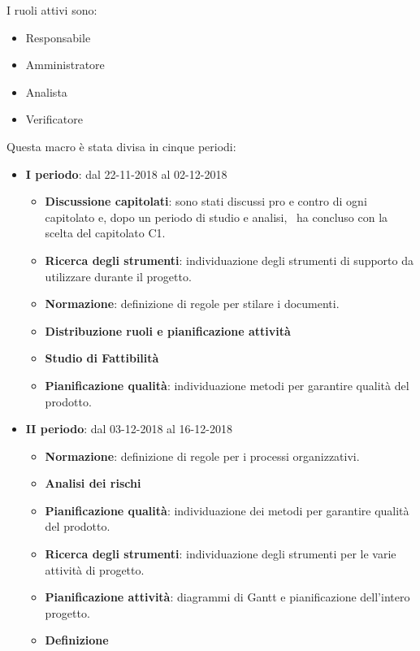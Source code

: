        I ruoli attivi sono:
        \begin{itemize}
            \item Responsabile
            \item Amministratore
            \item Analista
            \item Verificatore
        \end{itemize}
        Questa macro è stata divisa in cinque periodi:
		\begin{itemize}
			\item \textbf{I periodo}: dal 22-11-2018 al 02-12-2018
			\begin{itemize}
    	        \item \textbf{Discussione capitolati}: sono stati discussi pro e contro di ogni capitolato e, dopo un periodo di
				studio e analisi, \gruppo\ ha concluso con la scelta del capitolato C1.
    	        \item \textbf{Ricerca degli strumenti}: individuazione degli strumenti di supporto da utilizzare durante il progetto.
    	        \item \textbf{Normazione}: definizione di regole per stilare i documenti.
    	        \item \textbf{Distribuzione ruoli e pianificazione attività}
       	        \item \textbf{Studio di Fattibilità}
       	        \item \textbf{Pianificazione qualità}: individuazione metodi per garantire qualità del prodotto.
			\end{itemize}
			\newpage
			\item \textbf{II periodo}: dal 03-12-2018 al 16-12-2018
			\begin{itemize}
    	        \item \textbf{Normazione}: definizione di regole per i processi organizzativi.
    	        \item \textbf{Analisi dei rischi}
    	        \item \textbf{Pianificazione qualità}: individuazione dei metodi per garantire qualità del prodotto.
       	        \item \textbf{Ricerca degli strumenti}: individuazione degli strumenti per le varie attività di progetto.
       	        \item \textbf{Pianificazione attività}: diagrammi di Gantt e pianificazione dell'intero progetto.
       	        \item \textbf{Definizione }

\end{itemize}
\end{itemize}
